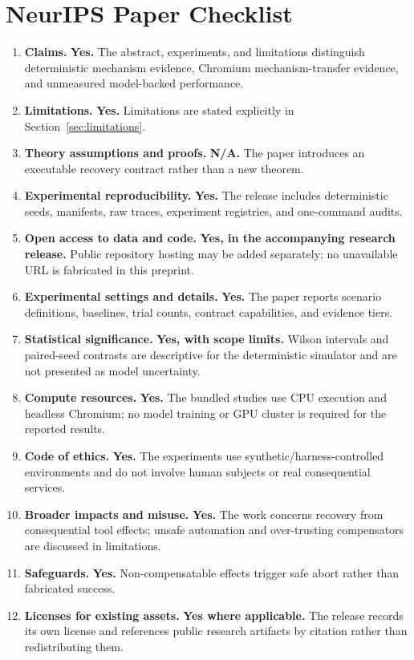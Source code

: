 \section*{NeurIPS Paper Checklist}
\small
\begin{enumerate}
\item \textbf{Claims.} \textbf{Yes.} The abstract, experiments, and limitations distinguish deterministic mechanism evidence, Chromium mechanism-transfer evidence, and unmeasured model-backed performance.
\item \textbf{Limitations.} \textbf{Yes.} Limitations are stated explicitly in Section~\ref{sec:limitations}.
\item \textbf{Theory assumptions and proofs.} \textbf{N/A.} The paper introduces an executable recovery contract rather than a new theorem.
\item \textbf{Experimental reproducibility.} \textbf{Yes.} The release includes deterministic seeds, manifests, raw traces, experiment registries, and one-command audits.
\item \textbf{Open access to data and code.} \textbf{Yes, in the accompanying research release.} Public repository hosting may be added separately; no unavailable URL is fabricated in this preprint.
\item \textbf{Experimental settings and details.} \textbf{Yes.} The paper reports scenario definitions, baselines, trial counts, contract capabilities, and evidence tiers.
\item \textbf{Statistical significance.} \textbf{Yes, with scope limits.} Wilson intervals and paired-seed contrasts are descriptive for the deterministic simulator and are not presented as model uncertainty.
\item \textbf{Compute resources.} \textbf{Yes.} The bundled studies use CPU execution and headless Chromium; no model training or GPU cluster is required for the reported results.
\item \textbf{Code of ethics.} \textbf{Yes.} The experiments use synthetic/harness-controlled environments and do not involve human subjects or real consequential services.
\item \textbf{Broader impacts and misuse.} \textbf{Yes.} The work concerns recovery from consequential tool effects; unsafe automation and over-trusting compensators are discussed in limitations.
\item \textbf{Safeguards.} \textbf{Yes.} Non-compensatable effects trigger safe abort rather than fabricated success.
\item \textbf{Licenses for existing assets.} \textbf{Yes where applicable.} The release records its own license and references public research artifacts by citation rather than redistributing them.

\end{enumerate}
